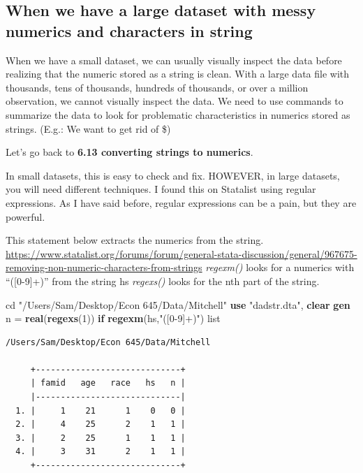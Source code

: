 \documentclass[
]{book}
\newenvironment{Shaded}{\begin{snugshade}}{\end{snugshade}}
\newcommand{\FunctionTok}[1]{\textcolor[rgb]{0.13,0.29,0.53}{\textbf{#1}}}
\newcommand{\KeywordTok}[1]{\textcolor[rgb]{0.13,0.29,0.53}{\textbf{#1}}}
\newcommand{\NormalTok}[1]{#1}
\newcommand{\OtherTok}[1]{\textcolor[rgb]{0.56,0.35,0.01}{#1}}
\newcommand{\StringTok}[1]{\textcolor[rgb]{0.31,0.60,0.02}{#1}}
\begin{document}
\subsection{When we have a large dataset with messy numerics and characters in string}\label{when-we-have-a-large-dataset-with-messy-numerics-and-characters-in-string}

When we have a small dataset, we can usually visually inspect the data before realizing that the numeric stored as a string is clean. With a large data file with thousands, tens of thousands, hundreds of thousands, or over a million observation, we cannot visually inspect the data. We need to use commands to summarize the data to look for problematic characteristics in numerics stored as strings. (E.g.: We want to get rid of \$)

Let's go back to \textbf{6.13 converting strings to numerics}.

In small datasets, this is easy to check and fix. HOWEVER, in large datasets, you will need different techniques. I found this on Statalist using regular expressions. As I have said before,
regular expressions can be a pain, but they are powerful.

This statement below extracts the numerics from the string.
\url{https://www.statalist.org/forums/forum/general-stata-discussion/general/967675-removing-non-numeric-characters-from-strings}
\emph{regexm()} looks for a numerics with ``({[}0-9{]}+)'' from the string hs
\emph{regexs()} looks for the nth part of the string.

\begin{Shaded}
\begin{Highlighting}[]
\NormalTok{cd }\StringTok{"/Users/Sam/Desktop/Econ 645/Data/Mitchell"}
\KeywordTok{use} \StringTok{"dadstr.dta"}\NormalTok{, }\KeywordTok{clear}
\KeywordTok{gen}\NormalTok{ n = }\FunctionTok{real}\NormalTok{(}\FunctionTok{regexs}\NormalTok{(1)) }\KeywordTok{if} \FunctionTok{regexm}\NormalTok{(hs,}\StringTok{"([0{-}9]+)"}\NormalTok{)}
\OtherTok{list}
\end{Highlighting}
\end{Shaded}

\begin{verbatim}
/Users/Sam/Desktop/Econ 645/Data/Mitchell

     +-----------------------------+
     | famid   age   race   hs   n |
     |-----------------------------|
  1. |     1    21      1    0   0 |
  2. |     4    25      2    1   1 |
  3. |     2    25      1    1   1 |
  4. |     3    31      2    1   1 |
     +-----------------------------+
\end{verbatim}
\end{document}
